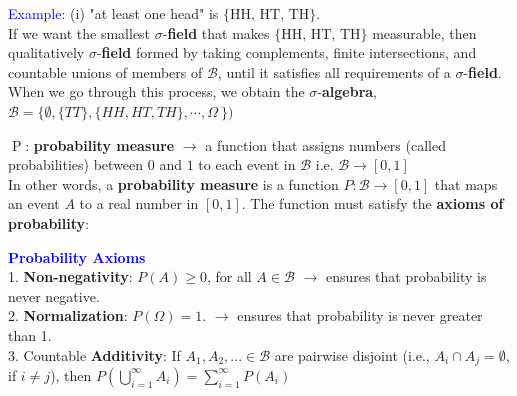\documentclass[letterpaper, 10.5pt,landscape]{article}
\begin{document}
\begin{multicols*}{3}
\vspace{3pt}
\textcolor{blue}{Example}: (i) "at least one head" is $\{\text{HH, HT, TH} \}$. \\
If we want the smallest $\sigma$-\textbf{field} that makes $\{\text{HH, HT, TH} \}$ measurable, then qualitatively $\sigma$-\textbf{field} formed by taking complements, finite intersections, and countable unions of members of \(\mathcal{B}\), until it satisfies all requirements of a $\sigma$-\textbf{field}. When we go through this process, we obtain the $\sigma$-\textbf{algebra},
\(\mathcal{B} = \{\emptyset, \{TT\},  \{HH, HT, TH\}, \cdots , \Omega  \ \})\)






\vspace{5pt}
$\mathrel{P}$: \textbf{probability measure} $\rightarrow$ a function that assigns numbers (called probabilities) between $0$ and $1$ to each event in $\mathcal{B}$ i.e. \( \mathcal{B} \rightarrow [0,1] \) \\
In other words, a \textbf{probability measure} is a function
\( \boxed{P : \mathcal{B} \rightarrow [0,1]}\)  that maps an event $A$ to a real number in \( [0,1]\). The function must satisfy the \textbf{axioms of probability}: \\

\vspace{2pt}

\textbf{\textcolor{blue}{Probability Axioms}} \\
1. \textbf{Non-negativity}: \(\boxed{P(A) \geq 0 }\), for all \(A \in \mathcal{B} \) $\rightarrow$ ensures that probability is never negative. \\
2. \textbf{Normalization}: \(\boxed{P(\Omega) = 1}\).   $\rightarrow$ ensures that probability is never greater than 1.\\
3. Countable \textbf{Additivity}: If \( A_{1}, A_{2}, ... \in \mathcal{B} \) are pairwise disjoint (i.e., \(A_{i} \cap A_{j} = \emptyset \), if $i\neq j$), then
\(\boxed{P \left( \bigcup \limits_{i=1}^{\infty} A_{i} \right) = \sum \limits_{i=1}^{\infty} P(A_{i})}\)



\end{multicols*}
\end{document}
